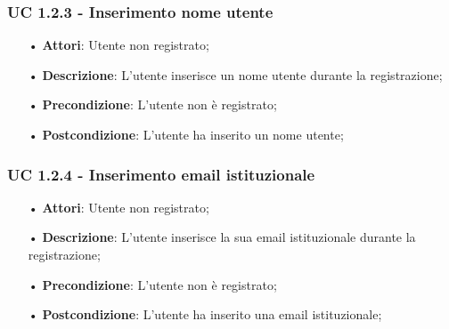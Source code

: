 
\subsubsection{UC 1.2.3 - Inserimento nome utente}
\begin{itemize}
	\item[•]\textbf{Attori}: Utente non registrato;
	\item[•]\textbf{Descrizione}: L'utente inserisce un nome utente durante la registrazione;
	\item[•]\textbf{Precondizione}: L'utente non è registrato;
	\item[•]\textbf{Postcondizione}: L'utente ha inserito un nome utente;
\end{itemize}

\subsubsection{UC 1.2.4 - Inserimento email istituzionale}
\begin{itemize}
	\item[•]\textbf{Attori}: Utente non registrato;
	\item[•]\textbf{Descrizione}: L'utente inserisce la sua email istituzionale durante la registrazione;
	\item[•]\textbf{Precondizione}: L'utente non è registrato;
	\item[•]\textbf{Postcondizione}: L'utente ha inserito una email istituzionale;
\end{itemize}

